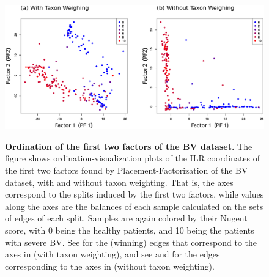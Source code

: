 \begin{figure}[!htb]
    \centering
     \includegraphics[width=\linewidth]{pdf/pf_bv_place_ilr_ordination.pdf}
    \begin{subfigure}{0pt}
        \label{supp:fig:pf_bv_place_ilr_ordination:sub:with_taxon_weighting}
    \end{subfigure}
    \begin{subfigure}{0pt}
        \label{supp:fig:pf_bv_place_ilr_ordination:sub:without_taxon_weighting}
    \end{subfigure}
    \caption{
        \textbf{Ordination of the first two factors of the \ac{BV} dataset.}
        The figure shows ordination-visualization plots of the ILR coordinates of the first two factors
        found by Placement-Factorization of the \ac{BV} dataset,
         with and
         without taxon weighting.
        That is, the axes correspond to the splits induced by the first two factors,
        while values along the axes are the balances of each sample calculated on the sets of edges of each split.
        Samples are again colored by their Nugent score, with \num{0} being the healthy patients,
        and \num{10} being the patients with severe \ac{BV}.
        See  for the (winning) edges that correspond to the axes
        in  (with taxon weighting),
        and see  and 
        for the edges corresponding to the axes in 
        (without taxon weighting).
    }
    \label{supp:fig:pf_bv_place_ilr_ordination}
\end{figure}

